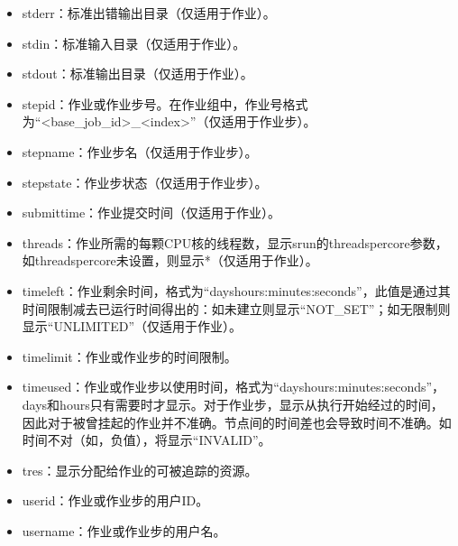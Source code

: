 \documentclass[a4paper,12pt,english]{sphinxmanual}
\begin{document}
\begin{itemize}
\begin{itemize}
\begin{itemize}
\item {} 
\sphinxAtStartPar
stderr：标准出错输出目录（仅适用于作业）。

\item {} 
\sphinxAtStartPar
stdin：标准输入目录（仅适用于作业）。

\item {} 
\sphinxAtStartPar
stdout：标准输出目录（仅适用于作业）。

\item {} 
\sphinxAtStartPar
stepid：作业或作业步号。在作业组中，作业号格式为“<base\_job\_id>\_<index>”（仅适用于作业步）。

\item {} 
\sphinxAtStartPar
stepname：作业步名（仅适用于作业步）。

\item {} 
\sphinxAtStartPar
stepstate：作业步状态（仅适用于作业步）。

\item {} 
\sphinxAtStartPar
submittime：作业提交时间（仅适用于作业）。

\item {} 
\sphinxAtStartPar
threads：作业所需的每颗CPU核的线程数，显示srun的\sphinxhyphen{}\sphinxhyphen{}threads\sphinxhyphen{}per\sphinxhyphen{}core参数，如\sphinxhyphen{}\sphinxhyphen{}threads\sphinxhyphen{}per\sphinxhyphen{}core未设置，则显示*（仅适用于作业）。

\item {} 
\sphinxAtStartPar
timeleft：作业剩余时间，格式为“days\sphinxhyphen{}hours:minutes:seconds”，此值是通过其时间限制减去已运行时间得出的：如未建立则显示“NOT\_SET”；如无限制则显示“UNLIMITED”（仅适用于作业）。

\item {} 
\sphinxAtStartPar
timelimit：作业或作业步的时间限制。

\item {} 
\sphinxAtStartPar
timeused：作业或作业步以使用时间，格式为“days\sphinxhyphen{}hours:minutes:seconds”，days和hours只有需要时才显示。对于作业步，显示从执行开始经过的时间，因此对于被曾挂起的作业并不准确。节点间的时间差也会导致时间不准确。如时间不对（如，负值），将显示“INVALID”。

\item {} 
\sphinxAtStartPar
tres：显示分配给作业的可被追踪的资源。

\item {} 
\sphinxAtStartPar
userid：作业或作业步的用户ID。

\item {} 
\sphinxAtStartPar
username：作业或作业步的用户名。


\end{itemize}
\end{itemize}
\end{itemize}
\end{document}
